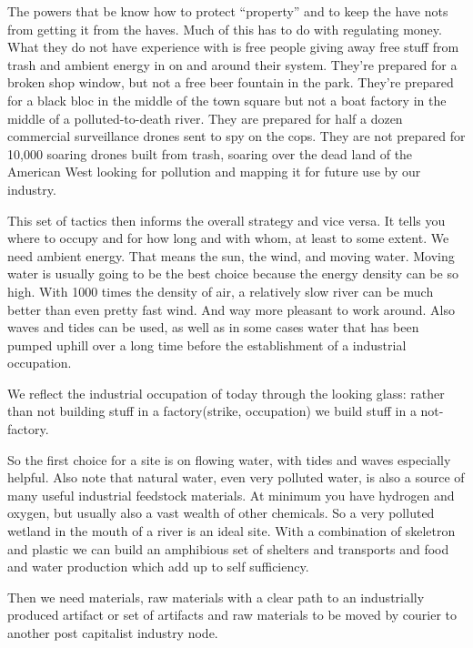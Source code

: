 The powers that be know how to protect ``property'' and to keep the have
nots from getting it from the haves. Much of this has to do with
regulating money. What they do not have experience with is free people
giving away free stuff from trash and ambient energy in on and around
their system. They're prepared for a broken shop window, but not a free
beer fountain in the park. They're prepared for a black bloc in the
middle of the town square but not a boat factory in the middle of a
polluted-to-death river. They are prepared for half a dozen commercial
surveillance drones sent to spy on the cops. They are not prepared for
10,000 soaring drones built from trash, soaring over the dead land of
the American West looking for pollution and mapping it for future use by
our industry.

This set of tactics then informs the overall strategy and vice versa. It
tells you where to occupy and for how long and with whom, at least to
some extent. We need ambient energy. That means the sun, the wind, and
moving water. Moving water is usually going to be the best choice
because the energy density can be so high. With 1000 times the density
of air, a relatively slow river can be much better than even pretty fast
wind. And way more pleasant to work around. Also waves and tides can be
used, as well as in some cases water that has been pumped uphill over a
long time before the establishment of a industrial occupation.

We reflect the industrial occupation of today through the looking glass:
rather than not building stuff in a factory(strike, occupation) we build
stuff in a not-factory.

So the first choice for a site is on flowing water, with tides and waves
especially helpful. Also note that natural water, even very polluted
water, is also a source of many useful industrial feedstock materials.
At minimum you have hydrogen and oxygen, but usually also a vast wealth
of other chemicals. So a very polluted wetland in the mouth of a river
is an ideal site. With a combination of skeletron and plastic we can
build an amphibious set of shelters and transports and food and water
production which add up to self sufficiency.

Then we need materials, raw materials with a clear path to an
industrially produced artifact or set of artifacts and raw materials to
be moved by courier to another post capitalist industry node.

